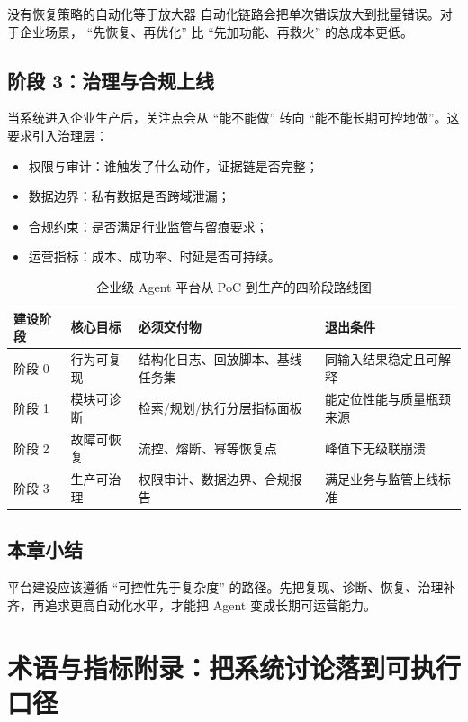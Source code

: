 \documentclass[a4paper]{article}
\begin{document}
\begin{warningbox}{没有恢复策略的自动化等于放大器}
自动化链路会把单次错误放大到批量错误。对于企业场景， ``先恢复、再优化'' 比 ``先加功能、再救火'' 的总成本更低。
\end{warningbox}

\subsection{阶段 3：治理与合规上线}
当系统进入企业生产后，关注点会从 ``能不能做'' 转向 ``能不能长期可控地做''。这要求引入治理层：
\begin{itemize}
    \item 权限与审计：谁触发了什么动作，证据链是否完整；
    \item 数据边界：私有数据是否跨域泄漏；
    \item 合规约束：是否满足行业监管与留痕要求；
    \item 运营指标：成本、成功率、时延是否可持续。
\end{itemize}

\begin{table}[H]
\centering
\begin{tabular}{p{2.4cm}p{3.5cm}p{3.6cm}p{3.6cm}}
\toprule
\textbf{建设阶段} & \textbf{核心目标} & \textbf{必须交付物} & \textbf{退出条件} \\
\midrule
阶段 0 & 行为可复现 & 结构化日志、回放脚本、基线任务集 & 同输入结果稳定且可解释 \\
阶段 1 & 模块可诊断 & 检索/规划/执行分层指标面板 & 能定位性能与质量瓶颈来源 \\
阶段 2 & 故障可恢复 & 流控、熔断、幂等恢复点 & 峰值下无级联崩溃 \\
阶段 3 & 生产可治理 & 权限审计、数据边界、合规报告 & 满足业务与监管上线标准 \\
\bottomrule
\end{tabular}
\caption{企业级 Agent 平台从 PoC 到生产的四阶段路线图}
\end{table}

\subsection{本章小结}
平台建设应该遵循 ``可控性先于复杂度'' 的路径。先把复现、诊断、恢复、治理补齐，再追求更高自动化水平，才能把 Agent 变成长期可运营能力。

\section{术语与指标附录：把系统讨论落到可执行口径}
\end{document}
